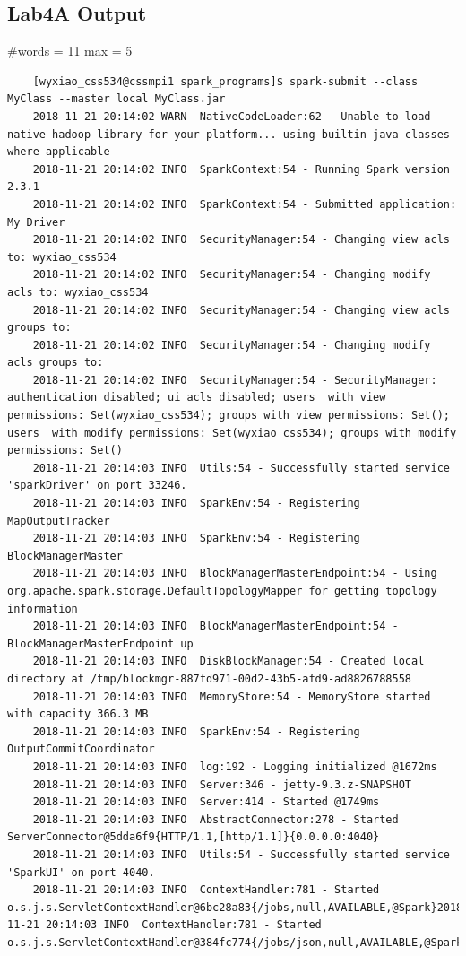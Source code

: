 \documentclass[11pt, letterpaper]{article}
\begin{document}
	\subsection{Lab4A Output}
	\noindent \#words = 11 \newline
	max = 5
	\begin{lstlisting}
	[wyxiao_css534@cssmpi1 spark_programs]$ spark-submit --class MyClass --master local MyClass.jar
	2018-11-21 20:14:02 WARN  NativeCodeLoader:62 - Unable to load native-hadoop library for your platform... using builtin-java classes where applicable
	2018-11-21 20:14:02 INFO  SparkContext:54 - Running Spark version 2.3.1
	2018-11-21 20:14:02 INFO  SparkContext:54 - Submitted application: My Driver
	2018-11-21 20:14:02 INFO  SecurityManager:54 - Changing view acls to: wyxiao_css534
	2018-11-21 20:14:02 INFO  SecurityManager:54 - Changing modify acls to: wyxiao_css534
	2018-11-21 20:14:02 INFO  SecurityManager:54 - Changing view acls groups to:
	2018-11-21 20:14:02 INFO  SecurityManager:54 - Changing modify acls groups to:
	2018-11-21 20:14:02 INFO  SecurityManager:54 - SecurityManager: authentication disabled; ui acls disabled; users  with view permissions: Set(wyxiao_css534); groups with view permissions: Set(); users  with modify permissions: Set(wyxiao_css534); groups with modify permissions: Set()
	2018-11-21 20:14:03 INFO  Utils:54 - Successfully started service 'sparkDriver' on port 33246.
	2018-11-21 20:14:03 INFO  SparkEnv:54 - Registering MapOutputTracker
	2018-11-21 20:14:03 INFO  SparkEnv:54 - Registering BlockManagerMaster
	2018-11-21 20:14:03 INFO  BlockManagerMasterEndpoint:54 - Using org.apache.spark.storage.DefaultTopologyMapper for getting topology information
	2018-11-21 20:14:03 INFO  BlockManagerMasterEndpoint:54 - BlockManagerMasterEndpoint up
	2018-11-21 20:14:03 INFO  DiskBlockManager:54 - Created local directory at /tmp/blockmgr-887fd971-00d2-43b5-afd9-ad8826788558
	2018-11-21 20:14:03 INFO  MemoryStore:54 - MemoryStore started with capacity 366.3 MB
	2018-11-21 20:14:03 INFO  SparkEnv:54 - Registering OutputCommitCoordinator
	2018-11-21 20:14:03 INFO  log:192 - Logging initialized @1672ms
	2018-11-21 20:14:03 INFO  Server:346 - jetty-9.3.z-SNAPSHOT
	2018-11-21 20:14:03 INFO  Server:414 - Started @1749ms
	2018-11-21 20:14:03 INFO  AbstractConnector:278 - Started ServerConnector@5dda6f9{HTTP/1.1,[http/1.1]}{0.0.0.0:4040}
	2018-11-21 20:14:03 INFO  Utils:54 - Successfully started service 'SparkUI' on port 4040.
	2018-11-21 20:14:03 INFO  ContextHandler:781 - Started o.s.j.s.ServletContextHandler@6bc28a83{/jobs,null,AVAILABLE,@Spark}2018-11-21 20:14:03 INFO  ContextHandler:781 - Started o.s.j.s.ServletContextHandler@384fc774{/jobs/json,null,AVAILABLE,@Spark}

\end{lstlisting}
\end{document}
